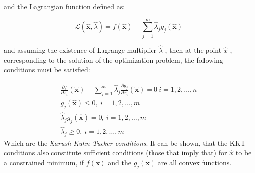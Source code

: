 \documentclass[conference]{IEEEtran}
\begin{document}
\begin{itemize}
 	and the Lagrangian function defined as:
 	
 	\begin{equation}
 		\mathcal{L}(\hat{\mathbf{x}},\hat{\lambda}) = f(\hat{\mathbf{x}}) - \sum_{j=1}^{m} \hat{\lambda}_j g_j(\hat{\mathbf{x}})
 	\end{equation}
 
	  and assuming the existence of Lagrange multiplier $\hat{\lambda}$ , then at the point $\hat{x}$ , corresponding to the solution of the optimization problem, the following conditions must be satisfied:
	
	
	\begin{equation}
		\begin{split}
			\frac{\partial f}{\partial x_i} (\hat{\mathbf{x}}) - \sum_{j=1}^{m} \hat{\lambda}_j \frac{\partial g_j}{\partial x_i} (\hat{\mathbf{x}}) = 0 \ i = 1, 2, \hdots, n\\
			g_j(\hat{\mathbf{x}}) \leq 0, \  i = 1, 2, \hdots, m\\
			\hat{\lambda}_j g_j(\hat{\mathbf{x}}) = 0, \  i = 1, 2, \hdots, m\\
			\hat{\lambda}_j \geq 0, \  i = 1, 2, \hdots, m
		\end{split}
	\end{equation}
	Which are the \textit{Karush-Kuhn-Tucker conditions}. It can be shown, that the KKT conditions also constitute sufficient conditions (those that imply that) for $\hat{x}$ to be a constrained minimum, if $f(\mathbf{x})$ and the $g_j(\mathbf{x})$	are all convex functions.
\end{itemize}
\end{document}
